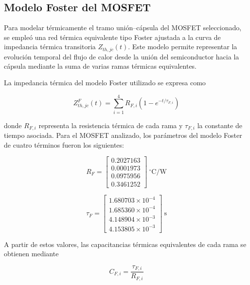 \documentclass[journal]{IEEEtran}
\begin{document}
\subsection{Modelo Foster del MOSFET}

Para modelar térmicamente el tramo unión--cápsula del MOSFET seleccionado, se empleó una red térmica equivalente tipo Foster ajustada a la curva de impedancia térmica transitoria $Z_{th,jc}(t)$. Este modelo permite representar la evolución temporal del flujo de calor desde la unión del semiconductor hacia la cápsula mediante la suma de varias ramas térmicas equivalentes.

La impedancia térmica del modelo Foster utilizado se expresa como

\begin{equation}
Z_{th,jc}^{F}(t)=\sum_{i=1}^{4} R_{F,i}\left(1-e^{-t/\tau_{F,i}}\right)
\label{eq:zth_foster_mosfet}
\end{equation}

donde $R_{F,i}$ representa la resistencia térmica de cada rama y $\tau_{F,i}$ la constante de tiempo asociada. Para el MOSFET analizado, los parámetros del modelo Foster de cuatro términos fueron los siguientes:

\begin{equation}
R_F=
\left[
\begin{array}{c}
0.2027163\\
0.0001973\\
0.0975956\\
0.3461252
\end{array}
\right]
\ ^\circ\mathrm{C/W}
\label{eq:rf_mosfet}
\end{equation}

\begin{equation}
\tau_F=
\left[
\begin{array}{c}
1.680703\times10^{-4}\\
1.685360\times10^{-4}\\
4.148904\times10^{-3}\\
4.153805\times10^{-3}
\end{array}
\right]
\ \mathrm{s}
\label{eq:tauf_mosfet}
\end{equation}

A partir de estos valores, las capacitancias térmicas equivalentes de cada rama se obtienen mediante

\begin{equation}
C_{F,i}=\frac{\tau_{F,i}}{R_{F,i}}
\label{eq:cf_general}
\end{equation}
\end{document}
